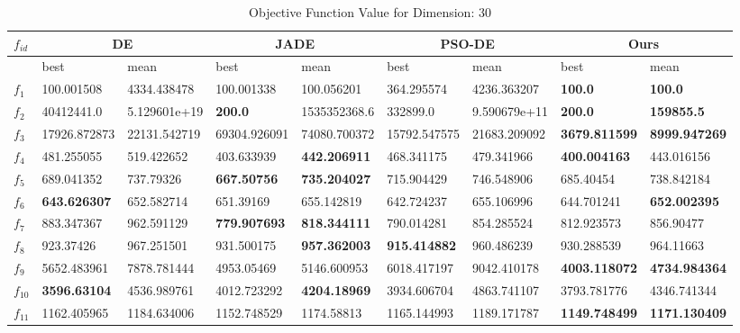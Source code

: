 \begin{table*}[t!]
\centering
\caption{Objective Function Value for Dimension: 30}
\vspace{-3mm}
 \begin{tabular}{|p{0.8cm}|p{1.6cm}|p{1.6cm}|p{1.6cm}|p{1.6cm}|p{1.6cm}|p{1.6cm}|p{1.6cm}|p{1.6cm}|} 
 \hline
$f_{id}$ & \multicolumn{2}{c|}{DE} & \multicolumn{2}{c|}{JADE} & \multicolumn{2}{c|}{PSO-DE} & \multicolumn{2}{c|}{Ours} \\
 \hline
    & best & mean & best & mean & best & mean & best & mean \\ [0.5ex] 
 \hline
$f_{1}$ & 100.001508 & 4334.438478 & 100.001338 & 100.056201 & 364.295574 & 4236.363207 & \textbf{100.0} & \textbf{100.0} \\ 
$f_{2}$  & 40412441.0 & 5.129601e+19 & \textbf{200.0} & 1535352368.6 & 332899.0 & 9.590679e+11 & \textbf{200.0} & \textbf{159855.5} \\ 
$f_{3}$  & 17926.872873 & 22131.542719 & 69304.926091 & 74080.700372 & 15792.547575 & 21683.209092 & \textbf{3679.811599} & \textbf{8999.947269} \\ 
$f_{4}$  & 481.255055 & 519.422652 & 403.633939 & \textbf{442.206911} & 468.341175 & 479.341966 & \textbf{400.004163} & 443.016156 \\ 
$f_{5}$  & 689.041352 & 737.79326 & \textbf{667.50756} & \textbf{735.204027} & 715.904429 & 746.548906 & 685.40454 & 738.842184 \\ 
$f_{6}$  & \textbf{643.626307} & 652.582714 & 651.39169 & 655.142819 & 642.724237 & 655.106996 & 644.701241 & \textbf{652.002395} \\ 
$f_{7}$  & 883.347367 & 962.591129 & \textbf{779.907693} & \textbf{818.344111} & 790.014281 & 854.285524 & 812.923573 & 856.90477 \\ 
$f_{8}$  & 923.37426 & 967.251501 & 931.500175 & \textbf{957.362003} & \textbf{915.414882} & 960.486239 & 930.288539 & 964.11663 \\ 
$f_{9}$  & 5652.483961 & 7878.781444 & 4953.05469 & 5146.600953 & 6018.417197 & 9042.410178 & \textbf{4003.118072} & \textbf{4734.984364} \\ 
$f_{10}$  & \textbf{3596.63104} & 4536.989761 & 4012.723292 & \textbf{4204.18969} & 3934.606704 & 4863.741107 & 3793.781776 & 4346.741344 \\ 
$f_{11}$  & 1162.405965 & 1184.634006 & 1152.748529 & 1174.58813 & 1165.144993 & 1189.171787 & \textbf{1149.748499} & \textbf{1171.130409} \\ 

\end{tabular}
\end{table*}

